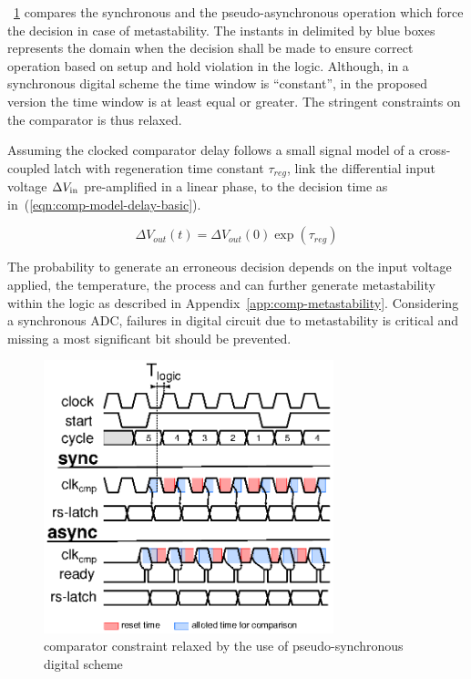 \figurename~\ref{fig:sar-sync-async} compares the synchronous and the pseudo-asynchronous operation which force the decision in case of metastability. The instants in delimited by blue boxes represents the domain when the decision shall be made to ensure correct operation based on setup and hold violation in the logic. Although, in a synchronous digital scheme the time window is ``constant'', in the proposed version the time window is at least equal or greater. The stringent constraints on the comparator is thus relaxed. 

Assuming the clocked comparator delay follows a small signal model of a cross-coupled latch with regeneration time constant \(\tau_{reg} \), link the differential input voltage \(\Delta V_{\rm in}\) pre-amplified in a linear phase, to the decision time as in~(\ref{eqn:comp-model-delay-basic}).

\begin{equation}
	\label{eqn:comp-model-delay-basic}
\Delta V_{out}(t) = \Delta V_{out}(0) \exp\left(\tau_{reg}\right)
\end{equation}

The probability to generate an erroneous decision depends on the input voltage applied, the temperature, the process and can further generate metastability  within the logic as described in Appendix~\ref{app:comp-metastability}. Considering a synchronous ADC, failures in digital circuit due to metastability is critical and missing a most significant bit should be prevented.

\begin{figure}[htp]
	\centering
	\includegraphics[width=0.75\textwidth]{Chapter4/Figs/sar-comp-constraint.ps}
	\caption{comparator constraint relaxed by the use of pseudo-synchronous digital scheme}
	\label{fig:sar-sync-async}
\end{figure}

